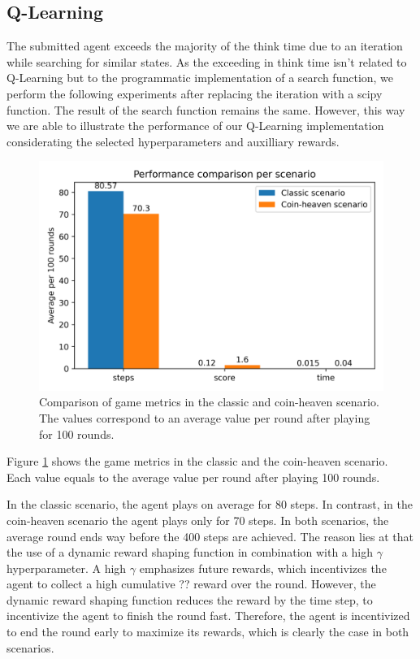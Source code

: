 \documentclass[
	letterpaper, %
	12pt, %
]{CSUniSchoolLabReport}
\begin{document}
\subsection{Q-Learning}
The submitted agent exceeds the majority of the think time due to an iteration while searching for
similar states.
As the exceeding in think time isn't related to Q-Learning but to the programmatic implementation of a search function,
we perform the following experiments after replacing the iteration with a scipy function.
The result of the search function remains the same.
However, this way we are able to illustrate the performance of our Q-Learning implementation
considerating the selected hyperparameters and auxilliary rewards.


\begin{figure}[h]
	\centering
	\includegraphics[scale=0.6]{Figures/metrics.png}
	\caption{Comparison of game metrics in the classic and coin-heaven scenario. The values
		correspond to an average value per round after playing for 100 rounds.}
	\label{img:metrics}
\end{figure}

Figure \ref{img:metrics} shows the game metrics in the classic and the coin-heaven
scenario. Each value equals to the average value per round after playing 100 rounds.

In the classic scenario, the agent plays on average for 80 steps. In contrast, in the
coin-heaven scenario the agent plays only for 70 steps. In both scenarios, the
average round ends way before the 400 steps are achieved. The reason lies at that
the use of a dynamic reward shaping function in combination with a high $\gamma$ hyperparameter.
A high $\gamma$ emphasizes future rewards, which incentivizes the agent to collect a high cumulative ?? reward
over the round. However, the dynamic reward shaping function reduces the reward by the time step,
to incentivize the agent to finish the round fast. Therefore, the agent is incentivized to end the
round early to maximize its rewards, which is clearly the case in both scenarios.
\end{document}
